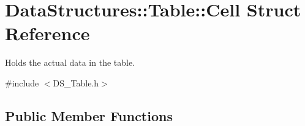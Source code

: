 \hypertarget{struct_data_structures_1_1_table_1_1_cell}{\section{Data\-Structures\-:\-:Table\-:\-:Cell Struct Reference}
\label{struct_data_structures_1_1_table_1_1_cell}
}


Holds the actual data in the table.  




{\ttfamily \#include $<$D\-S\-\_\-\-Table.\-h$>$}

\subsection*{Public Member Functions}
